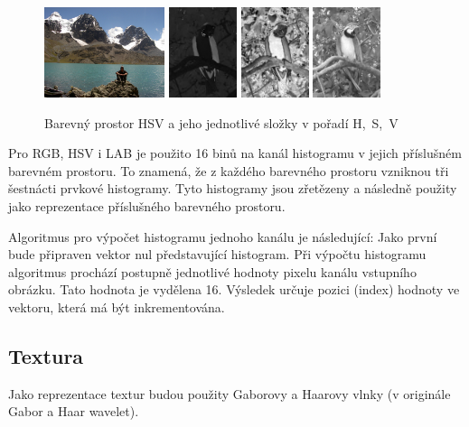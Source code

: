 \documentclass[czech,BP]{thesiskiv}
\begin{document}
\begin{figure}[H]
		\centering
		\includegraphics[height=100px]{./img/img_histogram.jpg}
		\includegraphics[height=100px]{./img/hsv_h.jpg}
		\includegraphics[height=100px]{./img/hsv_s.jpg}
		\includegraphics[height=100px]{./img/hsv_v.jpg}	
		\caption{Barevný prostor HSV a jeho jednotlivé složky v pořadí H,~S,~V}
\end{figure}

\par Pro RGB, HSV i LAB je použito 16 binů na kanál histogramu v jejich příslušném barevném prostoru. To znamená, že z každého barevného prostoru vzniknou tři šestnácti prvkové histogramy. Tyto histogramy jsou zřetězeny a následně použity jako reprezentace příslušného barevného prostoru.
 
\par  Algoritmus pro výpočet histogramu jednoho kanálu je následující: Jako první bude připraven vektor nul představující histogram. Při výpočtu histogramu algoritmus prochází postupně jednotlivé hodnoty pixelu kanálu vstupního obrázku. Tato hodnota je vydělena 16. Výsledek určuje pozici (index) hodnoty ve vektoru, která má být inkrementována.

\subsection{Textura}
\par Jako reprezentace textur budou použity Gaborovy a Haarovy vlnky (v originále Gabor a Haar wavelet). 
\end{document}

